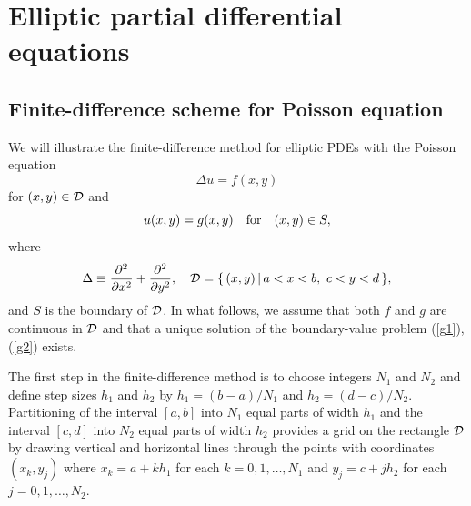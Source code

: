 %
%
%


\section{Elliptic partial differential equations}

\subsection{Finite-difference scheme for Poisson equation}

We will illustrate the finite-difference
method for elliptic PDEs with the Poisson equation
\begin{equation}
\Delta u = f(x,y)   \label{g1}
\end{equation}
for $(x,y)\in{\cal D}$ and
\begin{equation}
u(x,y) = g(x,y) \quad \hbox{for} \quad (x,y)\in S,   \label{g2}
\end{equation}
where
\[
\Delta\equiv\frac{{\partial}^{2}}{{\partial} x^{2}}+ \frac{{\partial}^{2}}{{\partial} y^{2}}, \quad
{\cal D}=\{\, (x,y)\, \vert \,  a<x<b, \ c<y<d \, \},
\]
and $S$ is the boundary of ${\cal D}$. In what follows, we assume that both
$f$ and $g$ are continuous
in ${\cal D}$ and that a unique solution of
the boundary-value problem (\ref{g1}), (\ref{g2}) exists.


 
The first step in the finite-difference method is to choose integers $N_{1}$ and $N_{2}$ and define
step sizes $h_{1}$ and $h_{2}$ by $h_{1}=(b-a)/N_{1}$ and $h_{2}=(d-c)/N_{2}$. Partitioning of
the interval $[a, b]$ into $N_{1}$ equal parts of width $h_{1}$ and
the interval $[c, d]$ into $N_{2}$ equal parts of width $h_{2}$ provides a grid on the
rectangle ${\cal D}$ by drawing vertical and horizontal lines through the points with coordinates
$(x_{k}, y_{j})$ where $x_{k}=a+kh_{1}$ for each $k=0,1,\dots,N_{1}$ and
$y_{j}=c+jh_{2}$ for each $j=0,1,\dots,N_{2}$.
 
